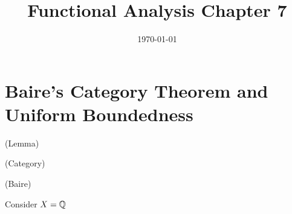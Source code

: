 \documentclass{article}
\title{Functional Analysis Chapter 7}
\date{\today}
\begin{document}
\maketitle

\section{Baire's Category Theorem and Uniform Boundedness}
\begin{thm}
    (Lemma)
\end{thm}
\begin{defn}
    (Category)
\end{defn}  
\begin{thm}
    (Baire)
\end{thm}  
\begin{eg}
    Consider $X=\mathbb{Q}$
\end{eg}
\end{document}

